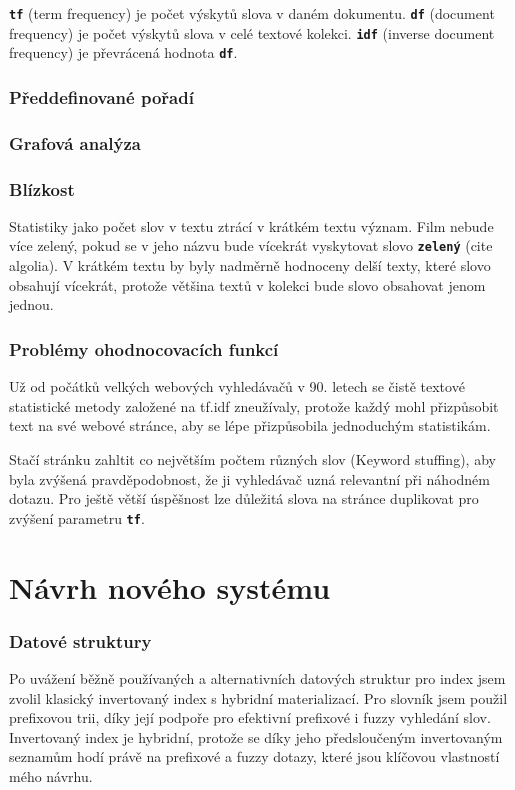\documentclass[11pt,letterpaper,oneside,openright]{book}
\newcommand{\bftt}[1]{\texttt{\textbf{#1}}}
\begin{document}
\bftt{tf} (term frequency) je počet výskytů slova v daném dokumentu. \bftt{df}
(document frequency) je počet výskytů slova v celé textové kolekci. \bftt{idf}
(inverse document frequency) je převrácená hodnota \bftt{df}.

\subsection{Předdefinované pořadí}

\subsection{Grafová analýza}

\subsection{Blízkost}
Statistiky jako počet slov v textu ztrácí v krátkém textu význam. Film
nebude více zelený, pokud se v jeho názvu bude vícekrát vyskytovat slovo
\bftt{zelený} (cite algolia). V krátkém textu by byly nadměrně hodnoceny
delší texty, které slovo obsahují vícekrát, protože většina textů v
kolekci bude slovo obsahovat jenom jednou.

\subsection{Problémy ohodnocovacích funkcí}
Už od počátků velkých webových vyhledávačů v 90. letech se čistě textové
statistické metody založené na tf.idf zneužívaly, protože každý mohl
přizpůsobit text na své webové stránce, aby se lépe přizpůsobila
jednoduchým statistikám.

Stačí stránku zahltit co největším počtem různých slov (Keyword
stuffing), aby byla zvýšená pravděpodobnost, že ji vyhledávač uzná
relevantní při náhodném dotazu. Pro ještě větší úspěšnost lze důležitá
slova na stránce duplikovat pro zvýšení parametru \bftt{tf}.




\chapter{Návrh nového systému}
\subsection{Datové struktury}
Po uvážení běžně používaných a alternativních datových struktur pro index jsem
zvolil klasický invertovaný index s hybridní materializací. Pro slovník jsem
použil prefixovou trii, díky její podpoře pro efektivní prefixové i fuzzy
vyhledání slov. Invertovaný index je hybridní, protože se díky jeho
předsloučeným invertovaným seznamům hodí právě na prefixové a fuzzy dotazy,
které jsou klíčovou vlastností mého návrhu.
\end{document}
